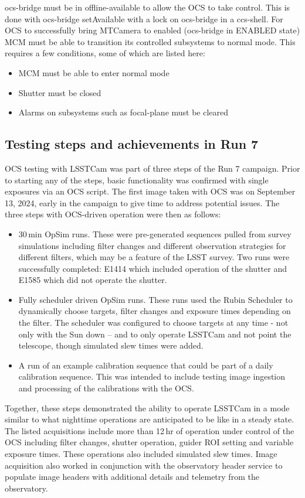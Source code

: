 ocs-bridge must be in offline-available to allow the OCS to take control. This is done with ocs-bridge setAvailable with a lock on ocs-bridge in a ccs-shell. For OCS to successfully bring MTCamera to enabled (ocs-bridge in ENABLED state) MCM must be able to transition its controlled subsystems to normal mode. This requires a few conditions, some of which are listed here:
\begin{itemize}
    \item MCM must be able to enter normal mode
    \item Shutter must be closed
    \item Alarms on subsystems such as focal-plane must be cleared
\end{itemize}

\subsection{Testing steps and achievements in Run 7}
OCS testing with LSSTCam was part of three steps of the Run 7 campaign. Prior to starting any of the steps, basic functionality was confirmed with single exposures via an OCS script. The first image taken with OCS was on September 13, 2024, early in the campaign to give time to address potential issues. The three steps with OCS-driven operation were then as follows:
\begin{itemize}
    \item 30\,min OpSim runs. These were pre-generated sequences pulled from survey simulations including filter changes and different observation strategies for different filters, which may be a feature of the LSST survey. Two runs were successfully completed: E1414 which included operation of the shutter and E1585 which did not operate the shutter.
    \item Fully scheduler driven OpSim runs. These runs used the Rubin Scheduler to dynamically choose targets, filter changes and exposure times depending on the filter. The scheduler was configured to choose targets at any time - not only with the Sun down -- and to only operate LSSTCam and not point the telescope, though simulated slew times were added. 
    \item A run of an example calibration sequence that could be part of a daily calibration sequence. This was intended to include testing image ingestion and processing of the calibrations with the OCS.
\end{itemize}

Together, these steps demonstrated the ability to operate LSSTCam in a mode similar to what nighttime operations are anticipated to be like in a steady state. The listed acquisitions include more than 12\,hr of operation under control of the OCS including filter changes, shutter operation, guider ROI setting and variable exposure times. These operations also included simulated slew times. Image acquisition also worked in conjunction with the observatory header service to populate image headers with additional details and telemetry from the observatory.

